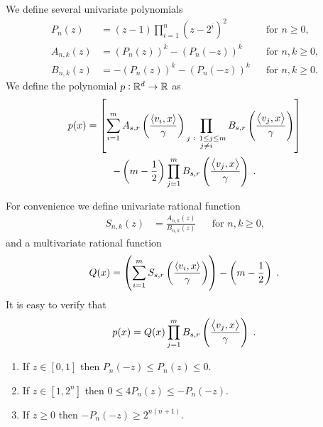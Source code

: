 We define several univariate polynomials
\begin{align*}
P_n(z) & = (z - 1) \prod_{i=1}^n (z - 2^i)^2 && \text{for $n \ge 0$,} \\
A_{n,k}(z) & = (P_n(z))^k - (P_n(-z))^k && \text{for $n,k \ge 0$,} \\
B_{n,k}(z) & = - (P_n(z))^k - (P_n(-z))^k && \text{for $n,k \ge 0$.}
\end{align*}
We define the polynomial $p:\mathbb{R}^d \to \mathbb{R}$ as
\begin{multline*}
p(x) = \left[ \sum_{i=1}^m A_{s,r}\left( \frac{\left\langle v_i, x \right\rangle}{\gamma} \right) \prod_{\substack{j ~:~ 1 \le j \le m \\ j \neq i}} B_{s,r} \left( \frac{\left\langle v_j, x \right\rangle}{\gamma} \right) \right] \\
- \left(m - \frac{1}{2} \right) \prod_{j=1}^m B_{s,r} \left( \frac{\left\langle v_j, x \right\rangle}{\gamma} \right) \; .
\end{multline*}

For convenience we define univariate rational function
\begin{align*}
S_{n,k}(z) & = \frac{A_{n,k}(z)}{B_{n,k}(z)} && \text{for $n,k \ge 0$,}
\end{align*}
and a multivariate rational function
$$
Q(x) = \left( \sum_{i=1}^m S_{s,r}\left( \frac{\left\langle v_i, x \right\rangle}{\gamma} \right) \right) - \left(m - \frac{1}{2} \right) \; .
$$
It is easy to verify that
$$
p(x) = Q(x) \prod_{j=1}^m B_{s,r} \left( \frac{\left\langle v_j, x \right\rangle}{\gamma} \right) \; .
$$

\begin{lemma}[Properties of $P_n$]
\label{lemma:properties-of-p-n}
\hspace{1cm} %
\begin{enumerate}
\item If $z \in [0,1]$ then $P_n(-z) \le P_n(z) \le 0$.
\item If $z \in [1,2^n]$ then $0 \le 4P_n(z) \le -P_n(-z)$.
\item If $z \ge 0$ then $-P_n(-z) \ge 2^{n(n+1)}$.
\end{enumerate}
\end{lemma}

